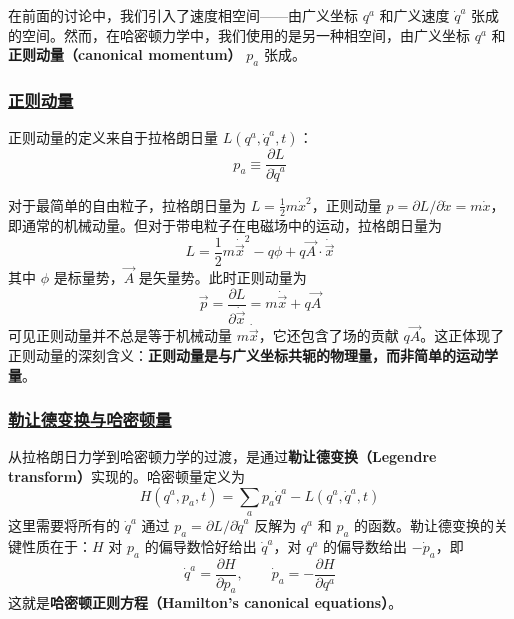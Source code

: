 在前面的讨论中，我们引入了速度相空间——由广义坐标 $q^a$ 和广义速度 $\dot{q}^a$ 张成的空间。然而，在哈密顿力学中，我们使用的是另一种相空间，由广义坐标 $q^a$ 和\textbf{正则动量（canonical momentum）} $p_a$ 张成。

\subsubsection{\protect\hyperlink{:}{正则动量}}

正则动量的定义来自于拉格朗日量 $L(q^a, \dot{q}^a, t)$：
\begin{equation}
    p_a \equiv \frac{\partial L}{\partial \dot{q}^a}
\end{equation}

对于最简单的自由粒子，拉格朗日量为 $L = \frac{1}{2}m\dot{x}^2$，正则动量 $p = \partial L/\partial \dot{x} = m\dot{x}$，即通常的机械动量。但对于带电粒子在电磁场中的运动，拉格朗日量为
\begin{equation}
    L = \frac{1}{2}m\dot{\vec{x}}^2 - q\phi + q\vec{A}\cdot\dot{\vec{x}}
\end{equation}
其中 $\phi$ 是标量势，$\vec{A}$ 是矢量势。此时正则动量为
\begin{equation}
    \vec{p} = \frac{\partial L}{\partial \dot{\vec{x}}} = m\dot{\vec{x}} + q\vec{A}
\end{equation}
可见正则动量并不总是等于机械动量 $m\dot{\vec{x}}$，它还包含了场的贡献 $q\vec{A}$。这正体现了正则动量的深刻含义：\textbf{正则动量是与广义坐标共轭的物理量，而非简单的运动学量}。

\subsubsection{\protect\hyperlink{:}{勒让德变换与哈密顿量}}

从拉格朗日力学到哈密顿力学的过渡，是通过\textbf{勒让德变换（Legendre transform）}实现的。哈密顿量定义为
\begin{equation}
    H(q^a, p_a, t) = \sum_a p_a \dot{q}^a - L(q^a, \dot{q}^a, t)
\end{equation}
这里需要将所有的 $\dot{q}^a$ 通过 $p_a = \partial L/\partial \dot{q}^a$ 反解为 $q^a$ 和 $p_a$ 的函数。勒让德变换的关键性质在于：$H$ 对 $p_a$ 的偏导数恰好给出 $\dot{q}^a$，对 $q^a$ 的偏导数给出 $-\dot{p}_a$，即
\begin{equation}
    \dot{q}^a = \frac{\partial H}{\partial p_a}, \qquad \dot{p}_a = -\frac{\partial H}{\partial q^a}
\end{equation}
这就是\textbf{哈密顿正则方程（Hamilton's canonical equations）}。

